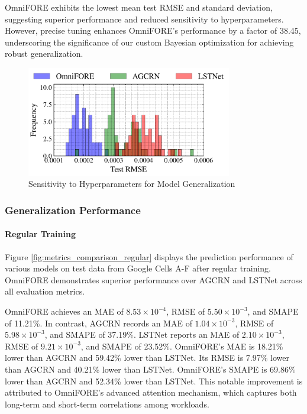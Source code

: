 \documentclass{ieeetmlcn}
\begin{document}
OmniFORE exhibits the lowest mean test RMSE and standard deviation, suggesting superior performance and reduced sensitivity to hyperparameters. However, precise tuning enhances OmniFORE's performance by a factor of 38.45, underscoring the significance of our custom Bayesian optimization for achieving robust generalization.

\begin{figure}\centering
\centering
\centering\includegraphics[width=0.8\textwidth]{img/test_rmse_distribution_histogram.png}
\caption{Sensitivity to Hyperparameters for Model Generalization}
\label{fig:test_rmse_distribution_histogram}
\end{figure}

\subsubsection{\textbf{Generalization Performance}}
\label{sec: Evaluation - Generalization Performance}
\paragraph*{Regular Training}
Figure \ref{fig:metrics_comparison_regular} displays the prediction performance of various models on test data from Google Cells A-F after regular training. OmniFORE demonstrates superior performance over AGCRN and LSTNet across all evaluation metrics.

OmniFORE achieves an MAE of $8.53 \times 10^{-4}$, RMSE of $5.50 \times 10^{-3}$, and SMAPE of 11.21\%. In contrast, AGCRN records an MAE of $1.04 \times 10^{-3}$, RMSE of $5.98 \times 10^{-3}$, and SMAPE of 37.19\%. LSTNet reports an MAE of $2.10 \times 10^{-3}$, RMSE of $9.21 \times 10^{-3}$, and SMAPE of 23.52\%. OmniFORE's MAE is 18.21\% lower than AGCRN and 59.42\% lower than LSTNet. Its RMSE is 7.97\% lower than AGCRN and 40.21\% lower than LSTNet. OmniFORE's SMAPE is 69.86\% lower than AGCRN and 52.34\% lower than LSTNet. This notable improvement is attributed to OmniFORE's advanced attention mechanism, which captures both long-term and short-term correlations among workloads.
\end{document}

